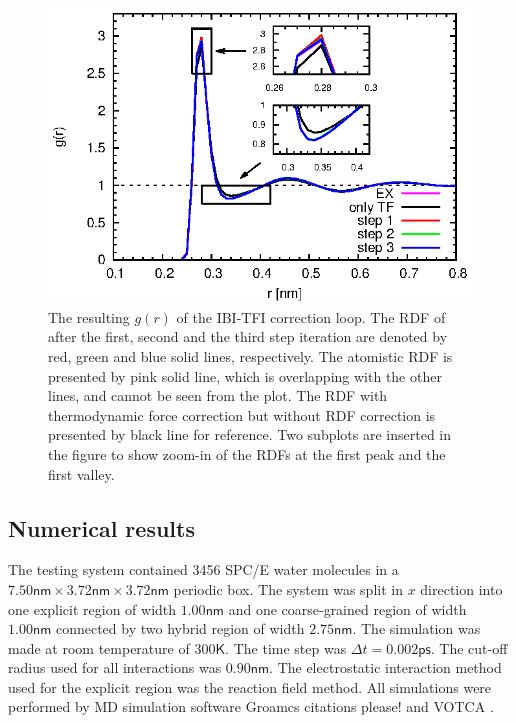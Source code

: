 \documentclass[aps,pre,preprint,unsortedaddress]{revtex4}
\newcommand{\redc}[1]{{\color{red} #1}}
\begin{document}
\begin{figure}
  \centering
  \includegraphics{fig/rdf.eps}
  \caption{The resulting $g(r)$ of the IBI-TFI correction loop.  The
    RDF of after the first, second and the third step iteration are
    denoted by red, green and blue solid lines, respectively.  The
    atomistic RDF is presented by pink solid line, which is
    overlapping with the other lines, and cannot be seen from the
    plot. The RDF with thermodynamic force correction but without RDF
    correction is presented by black line for reference. Two subplots
    are inserted in the figure to show zoom-in of the RDFs at the
    first peak and the first valley.}
  \label{fig:tmp4}
\end{figure}


\subsection{Numerical results}

The testing system contained 3456 SPC/E \cite{berendsen1987missing}
water molecules in a $7.50\textsf{nm}\times 3.72\textsf{nm}\times
3.72\textsf{nm}$ periodic box. The system was split in $x$ direction
into one explicit region of width $1.00\textsf{nm}$ and one
coarse-grained region of width $1.00\textsf{nm}$ connected by two
hybrid region of width $2.75\textsf{nm}$. The simulation was made at
room temperature of $300\textsf{K}$. The time step was $\Delta t =
0.002\textsf{ps}$. The cut-off radius used for all interactions was
$0.90\textsf{nm}$. The electrostatic interaction method used for the
explicit region was the reaction field method. All simulations were
performed by MD simulation software Groamcs \redc{citations please!}
and VOTCA \cite{ruehle2009versatile}.
\end{document}
